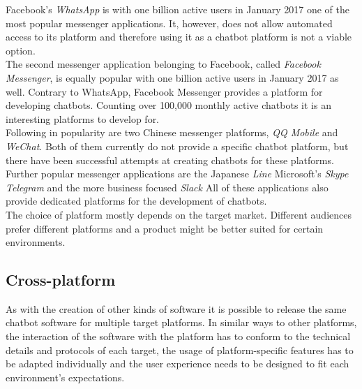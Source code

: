 Facebook's \emph{WhatsApp} is with one billion active users in January 2017\cite{fbpopular} one of the most popular messenger applications. It, however, does not allow automated access to its platform and therefore using it as a chatbot platform is not a viable option.
\\

The second messenger application belonging to Facebook, called \emph{Facebook Messenger}, is equally popular with one billion active users in January 2017\cite{fbpopular} as well. Contrary to WhatsApp, Facebook Messenger provides a platform for developing chatbots. Counting over 100,000 monthly active chatbots\cite{messenger} it is an interesting platforms to develop for.
\\

Following in popularity\cite{appusage} are two Chinese messenger platforms, \emph{QQ Mobile} and \emph{WeChat}. Both of them currently do not provide a specific chatbot platform, but there have been successful attempts at creating chatbots for these platforms\cite{wechatbot}.
\\

Further popular messenger applications are the Japanese \emph{Line} Microsoft's \emph{Skype} \emph{Telegram} and the more business focused \emph{Slack} All of these applications also provide dedicated platforms for the development of chatbots.
\\

The choice of platform mostly depends on the target market. Different audiences prefer different platforms and a product might be better suited for certain environments.


\subsection{Cross-platform}
\label{crossplatform}

As with the creation of other kinds of software it is possible to release the same chatbot software for multiple target platforms. In similar ways to other platforms, the interaction of the software with the platform has to conform to the technical details and protocols of each target, the usage of platform-specific features has to be adapted individually and the user experience needs to be designed to fit each environment's expectations.
\\

